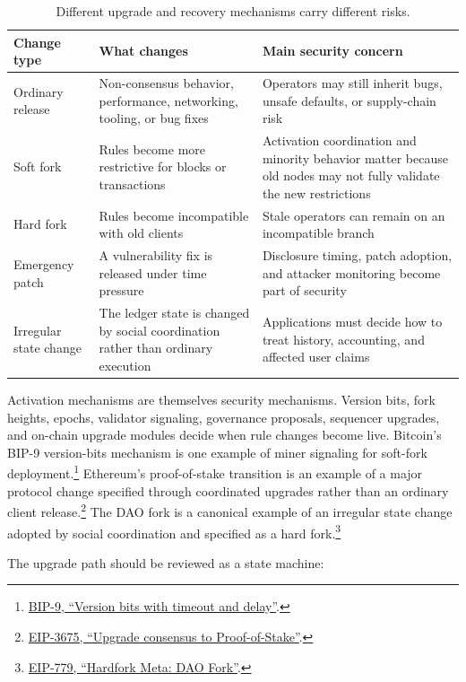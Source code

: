 \begin{table}[htbp]
\centering
\small
\renewcommand{\arraystretch}{1.15}
\begin{tabularx}{\textwidth}{@{}>{\RaggedRight\arraybackslash}p{}>{\RaggedRight\arraybackslash}p{}X@{}}
\toprule
Change type & What changes & Main security concern \\
\midrule
Ordinary release & Non-consensus behavior, performance, networking, tooling, or bug fixes & Operators may still inherit bugs, unsafe defaults, or supply-chain risk \\
Soft fork & Rules become more restrictive for blocks or transactions & Activation coordination and minority behavior matter because old nodes may not fully validate the new restrictions \\
Hard fork & Rules become incompatible with old clients & Stale operators can remain on an incompatible branch \\
Emergency patch & A vulnerability fix is released under time pressure & Disclosure timing, patch adoption, and attacker monitoring become part of security \\
Irregular state change & The ledger state is changed by social coordination rather than ordinary execution & Applications must decide how to treat history, accounting, and affected user claims \\
\bottomrule
\end{tabularx}
\caption{Different upgrade and recovery mechanisms carry different risks.}
\end{table}

Activation mechanisms are themselves security mechanisms. Version bits, fork heights, epochs, validator signaling, governance proposals, sequencer upgrades, and on-chain upgrade modules decide when rule changes become live. Bitcoin's BIP-9 version-bits mechanism is one example of miner signaling for soft-fork deployment.\footnote{\href{https://bips.dev/9/}{BIP-9, ``Version bits with timeout and delay''}.} Ethereum's proof-of-stake transition is an example of a major protocol change specified through coordinated upgrades rather than an ordinary client release.\footnote{\href{https://eips.ethereum.org/EIPS/eip-3675}{EIP-3675, ``Upgrade consensus to Proof-of-Stake''}.} The DAO fork is a canonical example of an irregular state change adopted by social coordination and specified as a hard fork.\footnote{\href{https://eips.ethereum.org/EIPS/eip-779}{EIP-779, ``Hardfork Meta: DAO Fork''}.}

The upgrade path should be reviewed as a state machine:

